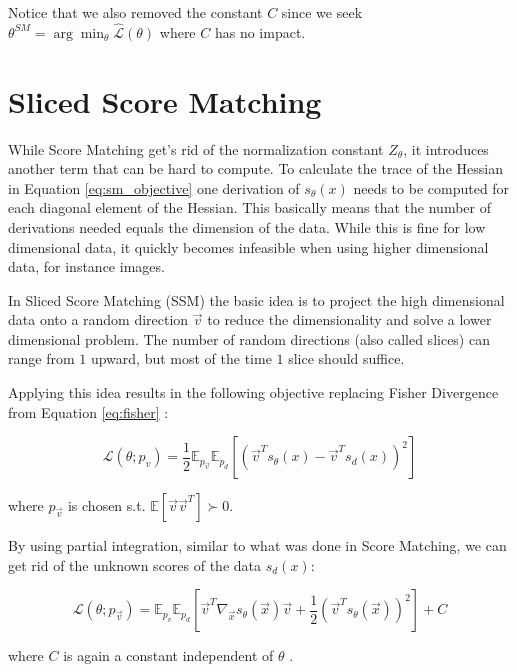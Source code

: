 Notice that we also removed the constant $C$ since we seek $\theta^{SM} = \arg\min_{\theta} \hat{\mathcal{L}}(\theta)$ where $C$ has no impact.

\section{Sliced Score Matching}
\label{sec:ssm}

While Score Matching get's rid of the normalization constant $Z_\theta$, it introduces another term that can be hard
to compute. To calculate the trace of the Hessian in Equation \ref{eq:sm_objective} one derivation of $s_\theta(x)$ needs to be computed for each diagonal element of the Hessian.
This basically means that the number of derivations needed equals the dimension of the data. 
While this is fine for low dimensional data, it quickly becomes infeasible when
using higher dimensional data, for instance images.  

In Sliced Score Matching (SSM) \cite{ssm} the basic idea is to project the high dimensional data onto a random direction $\vec v$ to reduce 
the dimensionality and solve a lower dimensional problem. The number of random directions (also called slices) can range from $1$ upward, but 
most of the time $1$ slice should suffice. 

Applying this idea results in the following objective replacing Fisher Divergence from Equation \ref{eq:fisher} \cite{ssm}: 

\begin{equation}
    \label{eq:ssm}
    \mathcal{L}(\theta; p_v) = \frac{1}{2} \mathbb{E}_{p_{\vec v}} \mathbb{E}_{p_d} \left[ \left( \vec{v}^T s_\theta(x) - \vec{v}^T s_d(x) \right)^2 \right]
\end{equation}

where $p_{\vec v}$ is chosen s.t. $\mathbb{E}\left[\vec v \vec v^T\right] \succ 0$.

By using partial integration, similar to what was done in Score Matching, we can get rid of the unknown scores of the data $s_d(x)$:

\begin{equation}
    \label{eq:ssm_final}
    \mathcal{L}(\theta; p_\vec{v}) = \mathbb{E}_{p_v} \mathbb{E}_{p_d} \left[ \vec{v}^T \nabla_\vec{x} s_\theta(\vec{x}) \vec{v} + \frac{1}{2} \left( \vec{v}^T s_\theta(\vec{x}) \right)^2 \right] + C
\end{equation}

where $C$ is again a constant independent of $\theta$ \cite{ssm}. 

